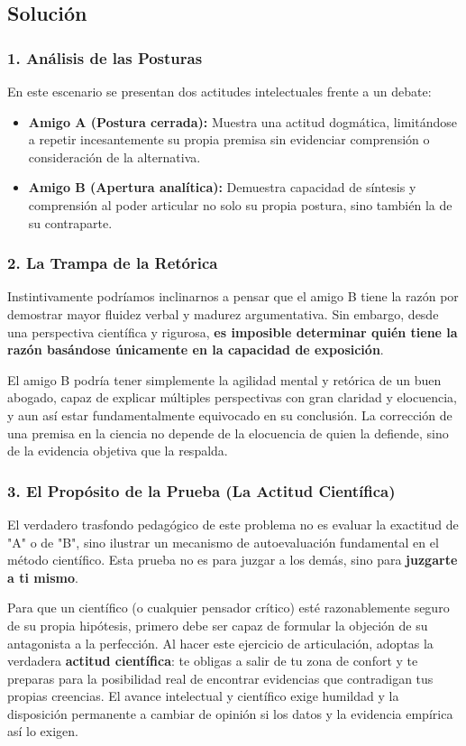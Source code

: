 \documentclass[12pt, a4paper]{article}
\begin{document}
\subsection*{Solución}

\subsubsection*{1. Análisis de las Posturas}
En este escenario se presentan dos actitudes intelectuales frente a un debate:
\begin{itemize}
    \item \textbf{Amigo A (Postura cerrada):} Muestra una actitud dogmática, limitándose a repetir incesantemente su propia premisa sin evidenciar comprensión o consideración de la alternativa.
    \item \textbf{Amigo B (Apertura analítica):} Demuestra capacidad de síntesis y comprensión al poder articular no solo su propia postura, sino también la de su contraparte.
\end{itemize}

\subsubsection*{2. La Trampa de la Retórica}
Instintivamente podríamos inclinarnos a pensar que el amigo B tiene la razón por demostrar mayor fluidez verbal y madurez argumentativa. Sin embargo, desde una perspectiva científica y rigurosa, \textbf{es imposible determinar quién tiene la razón basándose únicamente en la capacidad de exposición}. 

El amigo B podría tener simplemente la agilidad mental y retórica de un buen abogado, capaz de explicar múltiples perspectivas con gran claridad y elocuencia, y aun así estar fundamentalmente equivocado en su conclusión. La corrección de una premisa en la ciencia no depende de la elocuencia de quien la defiende, sino de la evidencia objetiva que la respalda.

\subsubsection*{3. El Propósito de la Prueba (La Actitud Científica)}
El verdadero trasfondo pedagógico de este problema no es evaluar la exactitud de "A" o de "B", sino ilustrar un mecanismo de autoevaluación fundamental en el método científico. Esta prueba no es para juzgar a los demás, sino para \textbf{juzgarte a ti mismo}.

Para que un científico (o cualquier pensador crítico) esté razonablemente seguro de su propia hipótesis, primero debe ser capaz de formular la objeción de su antagonista a la perfección. Al hacer este ejercicio de articulación, adoptas la verdadera \textbf{actitud científica}: te obligas a salir de tu zona de confort y te preparas para la posibilidad real de encontrar evidencias que contradigan tus propias creencias. El avance intelectual y científico exige humildad y la disposición permanente a cambiar de opinión si los datos y la evidencia empírica así lo exigen.
\end{document}
